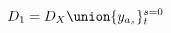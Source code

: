 \documentclass[preview]{standalone}
\begin{document}
\begin{align*}
D_{1} = D_{X} \union \{y_{a_{s}}\}_{t}^{s=0}
\end{align*}
\end{document}
